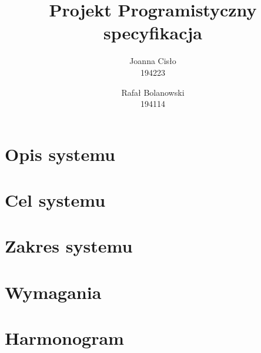 \documentclass[a4paper,12pt]{article}
\begin{document}
\author{Joanna Cisło\\194223 \and Rafał Bolanowski\\194114}
\title{Projekt Programistyczny\\specyfikacja}
\maketitle

\section*{Opis systemu}


\section*{Cel systemu}


\section*{Zakres systemu}


\section*{Wymagania}


\section*{Harmonogram}

\end{document}
